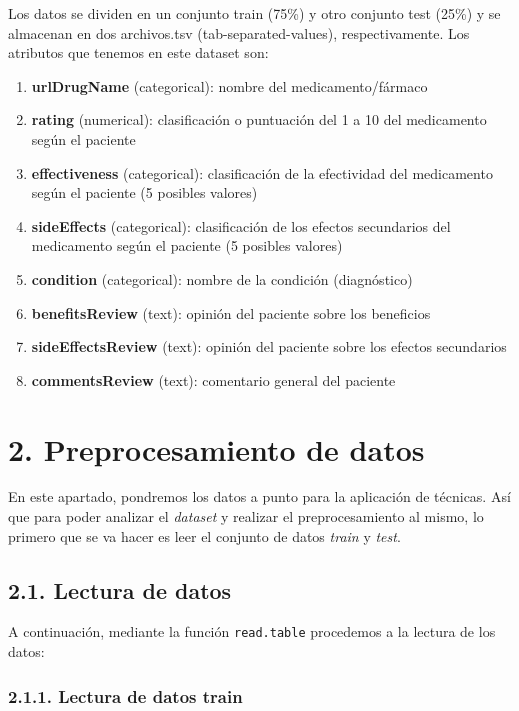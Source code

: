 \documentclass[spanish,]{article}
\providecommand{\tightlist}{%
  \setlength{\itemsep}{0pt}\setlength{\parskip}{0pt}}
\begin{document}
Los datos se dividen en un conjunto train (75\%) y otro conjunto test
(25\%) y se almacenan en dos archivos.tsv (tab-separated-values),
respectivamente. Los atributos que tenemos en este dataset son:

\begin{enumerate}
\def\labelenumi{\arabic{enumi}.}
\tightlist
\item
  \textbf{urlDrugName} (categorical): nombre del medicamento/fármaco
\item
  \textbf{rating} (numerical): clasificación o puntuación del 1 a 10 del
  medicamento según el paciente
\item
  \textbf{effectiveness} (categorical): clasificación de la efectividad
  del medicamento según el paciente (5 posibles valores)
\item
  \textbf{sideEffects} (categorical): clasificación de los efectos
  secundarios del medicamento según el paciente (5 posibles valores)
\item
  \textbf{condition} (categorical): nombre de la condición (diagnóstico)
\item
  \textbf{benefitsReview} (text): opinión del paciente sobre los
  beneficios
\item
  \textbf{sideEffectsReview} (text): opinión del paciente sobre los
  efectos secundarios
\item
  \textbf{commentsReview} (text): comentario general del paciente
\end{enumerate}

\section{2. Preprocesamiento de datos}\label{preprocesamiento-de-datos}

En este apartado, pondremos los datos a punto para la aplicación de
técnicas. Así que para poder analizar el \emph{dataset} y realizar el
preprocesamiento al mismo, lo primero que se va hacer es leer el
conjunto de datos \emph{train} y \emph{test}.

\subsection{2.1. Lectura de datos}\label{lectura-de-datos}

A continuación, mediante la función \texttt{read.table} procedemos a la
lectura de los datos:

\subsubsection{2.1.1. Lectura de datos
train}\label{lectura-de-datos-train}
\end{document}

